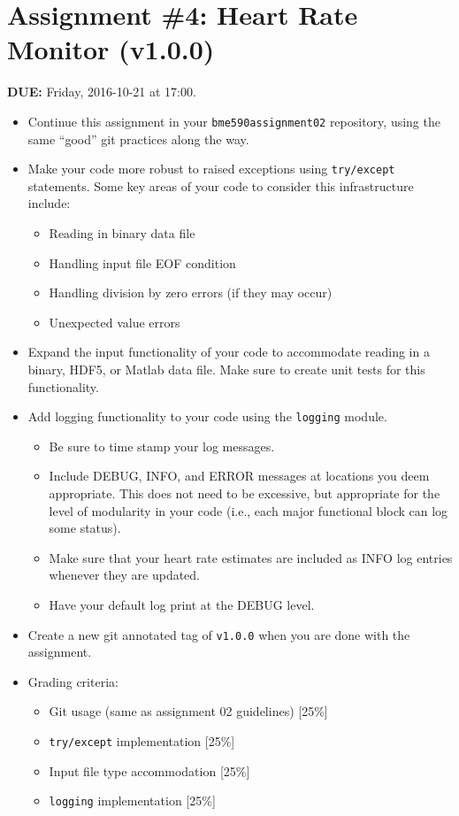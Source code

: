 


\section*{Assignment \#4: Heart Rate Monitor (v1.0.0)}

{\bf DUE:} Friday, 2016-10-21 at 17:00.

\begin{itemize}

\item Continue this assignment in your \verb+bme590assignment02+ repository,
    using the same ``good'' git practices along the way.

\item Make your code more robust to raised exceptions using \verb+try/except+
    statements.  Some key areas of your code to consider this infrastructure
        include:
\begin{itemize}
    \item Reading in binary data file
    \item Handling input file EOF condition
    \item Handling division by zero errors (if they may occur)
    \item Unexpected value errors
\end{itemize}

\item Expand the input functionality of your code to accommodate reading in a
    binary, HDF5, or Matlab data file.  Make sure to create unit tests for this
        functionality.
    
\item Add logging functionality to your code using the \verb+logging+ module.
\begin{itemize}
    \item Be sure to time stamp your log messages.
    \item Include DEBUG, INFO, and ERROR messages at locations you deem
        appropriate.  This does not need to be excessive, but appropriate for
        the level of modularity in your code (i.e., each major functional block
        can log some status).  
    \item Make sure that your heart rate estimates are included as INFO log
        entries whenever they are updated.
    \item Have your default log print at the DEBUG level.
\end{itemize}

\item Create a new git annotated tag of \verb+v1.0.0+ when you are done with the
    assignment.

\item Grading criteria:
\begin{itemize}
    \item Git usage (same as assignment 02 guidelines) [25\%]
    \item \verb+try/except+ implementation [25\%]
    \item Input file type accommodation [25\%]
    \item \verb+logging+ implementation [25\%]
\end{itemize}




\end{itemize}


